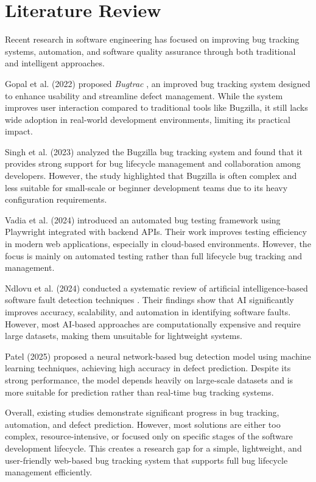 \documentclass[12pt]{article}
\begin{document}
\section{Literature Review}

Recent research in software engineering has focused on improving bug tracking systems, automation, and software quality assurance through both traditional and intelligent approaches.

Gopal et al. (2022) proposed \textit{Bugtrac} \cite{singh2023bugzilla}, an improved bug tracking system designed to enhance usability and streamline defect management. While the system improves user interaction compared to traditional tools like Bugzilla, it still lacks wide adoption in real-world development environments, limiting its practical impact.

Singh et al. (2023) analyzed the Bugzilla bug tracking system \cite{gopal2022bugtrac} and found that it provides strong support for bug lifecycle management and collaboration among developers. However, the study highlighted that Bugzilla is often complex and less suitable for small-scale or beginner development teams due to its heavy configuration requirements.

Vadia et al. (2024)  introduced an automated bug testing framework \cite{vadia2024playwright} using Playwright integrated with backend APIs. Their work improves testing efficiency in modern web applications, especially in cloud-based environments. However, the focus is mainly on automated testing rather than full lifecycle bug tracking and management.

Ndlovu et al. (2024) conducted a systematic review of artificial intelligence-based software fault detection techniques  \cite{ndlovu2024ai}. Their findings show that AI significantly improves accuracy, scalability, and automation in identifying software faults. However, most AI-based approaches are computationally expensive and require large datasets, making them unsuitable for lightweight systems.

Patel (2025) proposed a neural network-based bug detection model\cite{patel2025ml} using machine learning techniques, achieving high accuracy in defect prediction. Despite its strong performance, the model depends heavily on large-scale datasets and is more suitable for prediction rather than real-time bug tracking systems.

Overall, existing studies demonstrate significant progress in bug tracking, automation, and defect prediction. However, most solutions are either too complex, resource-intensive, or focused only on specific stages of the software development lifecycle. This creates a research gap for a simple, lightweight, and user-friendly web-based bug tracking system that supports full bug lifecycle management efficiently.
\end{document}
